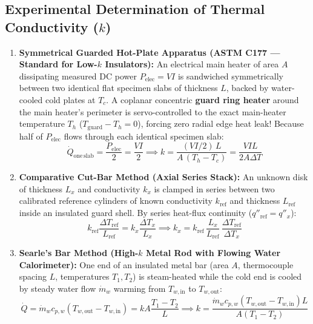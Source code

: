 \subsection{Experimental Determination of Thermal Conductivity ($k$)}
\begin{enumerate}
  \item \textbf{Symmetrical Guarded Hot-Plate Apparatus (ASTM C177 — Standard for Low-$k$ Insulators):} An electrical main heater of area $A$ dissipating measured DC power $P_{\mathrm{elec}} = V I$ is sandwiched symmetrically between two identical flat specimen slabs of thickness $L$, backed by water-cooled cold plates at $T_c$. A coplanar concentric \textbf{guard ring heater} around the main heater's perimeter is servo-controlled to the exact main-heater temperature $T_h$ ($T_{\mathrm{guard}} - T_h = 0$), forcing zero radial edge heat leak! Because half of $P_{\mathrm{elec}}$ flows through each identical specimen slab:
  \begin{equation}
    \dot{Q}_{\mathrm{one\,slab}} = \frac{P_{\mathrm{elec}}}{2} = \frac{V I}{2} \implies k = \frac{(V I / 2)\,L}{A\,(T_h - T_c)} = \frac{V I L}{2 A \Delta T}
    \label{eq:10:guarded-hot-plate}
  \end{equation}
  \item \textbf{Comparative Cut-Bar Method (Axial Series Stack):} An unknown disk of thickness $L_x$ and conductivity $k_x$ is clamped in series between two calibrated reference cylinders of known conductivity $k_{\mathrm{ref}}$ and thickness $L_{\mathrm{ref}}$ inside an insulated guard shell. By series heat-flux continuity ($q''_{\mathrm{ref}} = q''_x$):
  \begin{equation}
    k_{\mathrm{ref}}\frac{\Delta T_{\mathrm{ref}}}{L_{\mathrm{ref}}} = k_x \frac{\Delta T_x}{L_x} \implies k_x = k_{\mathrm{ref}}\,\frac{L_x}{L_{\mathrm{ref}}}\,\frac{\Delta T_{\mathrm{ref}}}{\Delta T_x}
    \label{eq:10:comparative-bar}
  \end{equation}
  \item \textbf{Searle's Bar Method (High-$k$ Metal Rod with Flowing Water Calorimeter):} One end of an insulated metal bar (area $A$, thermocouple spacing $L$, temperatures $T_1, T_2$) is steam-heated while the cold end is cooled by steady water flow $\dot{m}_w$ warming from $T_{w,\mathrm{in}}$ to $T_{w,\mathrm{out}}$:
  \begin{equation}
    \dot{Q} = \dot{m}_w c_{p,w}\left(T_{w,\mathrm{out}} - T_{w,\mathrm{in}}\right) = k A \frac{T_1 - T_2}{L} \implies k = \frac{\dot{m}_w c_{p,w}(T_{w,\mathrm{out}} - T_{w,\mathrm{in}}) L}{A(T_1 - T_2)}
    \label{eq:10:searles-bar}
  \end{equation}
\end{enumerate}

